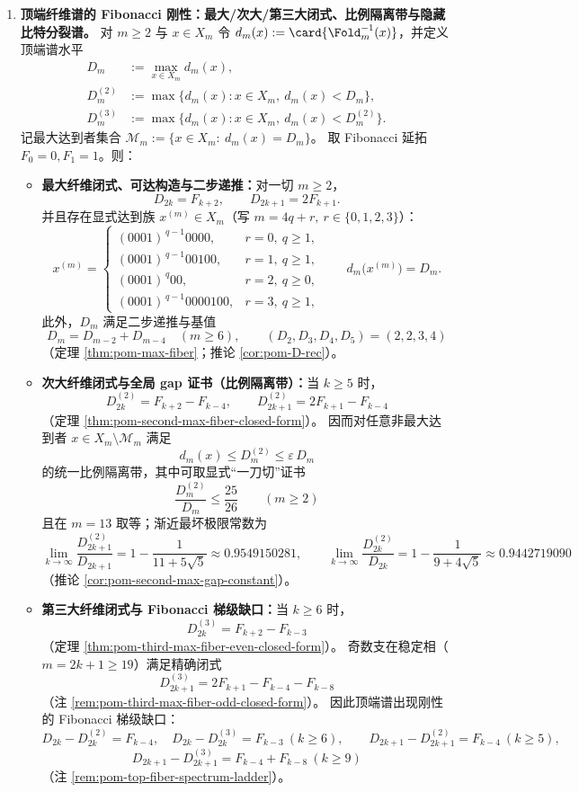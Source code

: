 \begin{enumerate}
  \item \textbf{顶端纤维谱的 Fibonacci 刚性：最大/次大/第三大闭式、比例隔离带与隐藏比特分裂谱。}
  对 \(m\ge 2\) 与 \(x\in X_m\) 令
  \(
  d_m(x):=\card{\Fold_m^{-1}(x)}
  \)，并定义顶端谱水平
  \[
  \begin{aligned}
  D_m &:=\max_{x\in X_m} d_m(x),\\
  D_m^{(2)} &:=\max\{d_m(x):x\in X_m,\ d_m(x)<D_m\},\\
  D_m^{(3)} &:=\max\{d_m(x):x\in X_m,\ d_m(x)<D_m^{(2)}\}.
  \end{aligned}
  \]
  记最大达到者集合 \(\mathcal{M}_m:=\{x\in X_m:\ d_m(x)=D_m\}\)。
  取 Fibonacci 延拓 \(F_0=0,F_1=1\)。则：
  \begin{itemize}
    \item \textbf{最大纤维闭式、可达构造与二步递推：}对一切 \(m\ge 2\)，
    \[
    D_{2k}=F_{k+2},\qquad D_{2k+1}=2F_{k+1}.
    \]
    并且存在显式达到族 \(x^{(m)}\in X_m\)（写 \(m=4q+r,\ r\in\{0,1,2,3\}\)）：
    \[
    x^{(m)}=
    \begin{cases}
    (0001)^{\,q-1}0000,& r=0,\ q\ge 1,\\[2pt]
    (0001)^{\,q-1}00100,& r=1,\ q\ge 1,\\[2pt]
    (0001)^{\,q}00,& r=2,\ q\ge 0,\\[2pt]
    (0001)^{\,q-1}0000100,& r=3,\ q\ge 1,
    \end{cases}
    \qquad
    d_m\!\bigl(x^{(m)}\bigr)=D_m.
    \]
    此外，\(D_m\) 满足二步递推与基值
    \[
    D_m=D_{m-2}+D_{m-4}\quad(m\ge 6),\qquad (D_2,D_3,D_4,D_5)=(2,2,3,4)
    \]
    （定理 \ref{thm:pom-max-fiber}；推论 \ref{cor:pom-D-rec}）。

    \item \textbf{次大纤维闭式与全局 gap 证书（比例隔离带）：}当 \(k\ge 5\) 时，
    \[
    D_{2k}^{(2)}=F_{k+2}-F_{k-4},\qquad
    D_{2k+1}^{(2)}=2F_{k+1}-F_{k-4}
    \]
    （定理 \ref{thm:pom-second-max-fiber-closed-form}）。
    因而对任意非最大达到者 \(x\in X_m\setminus\mathcal{M}_m\) 满足
    \[
    d_m(x)\le D_m^{(2)}\le \varepsilon\,D_m
    \]
    的统一比例隔离带，其中可取显式“一刀切”证书
    \[
    \boxed{\;\frac{D_m^{(2)}}{D_m}\le \frac{25}{26}\qquad(m\ge 2)\;}
    \]
    且在 \(m=13\) 取等；渐近最坏极限常数为
    \[
    \lim_{k\to\infty}\frac{D_{2k+1}^{(2)}}{D_{2k+1}}
    =1-\frac{1}{11+5\sqrt5}\approx 0.9549150281,
    \qquad
    \lim_{k\to\infty}\frac{D_{2k}^{(2)}}{D_{2k}}
    =1-\frac{1}{9+4\sqrt5}\approx 0.9442719090
    \]
    （推论 \ref{cor:pom-second-max-gap-constant}）。

    \item \textbf{第三大纤维闭式与 Fibonacci 梯级缺口：}当 \(k\ge 6\) 时，
    \[
    D_{2k}^{(3)}=F_{k+2}-F_{k-3}
    \]
    （定理 \ref{thm:pom-third-max-fiber-even-closed-form}）。
    奇数支在稳定相（\(m=2k+1\ge 19\)）满足精确闭式
    \[
    D_{2k+1}^{(3)}=2F_{k+1}-F_{k-4}-F_{k-8}
    \]
    （注 \ref{rem:pom-third-max-fiber-odd-closed-form}）。
    因此顶端谱出现刚性的 Fibonacci 梯级缺口：
    \[
    D_{2k}-D_{2k}^{(2)}=F_{k-4},\quad D_{2k}-D_{2k}^{(3)}=F_{k-3}\ (k\ge 6),
    \qquad
    D_{2k+1}-D_{2k+1}^{(2)}=F_{k-4}\ (k\ge 5),
    \]
    \[
    D_{2k+1}-D_{2k+1}^{(3)}=F_{k-4}+F_{k-8}\ (k\ge 9)
    \]
    （注 \ref{rem:pom-top-fiber-spectrum-ladder}）。


\end{itemize}
\end{enumerate}
